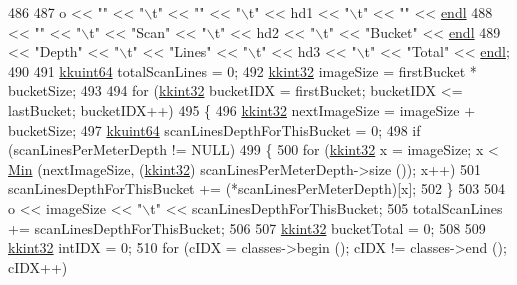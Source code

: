 \begin{DoxyCode}
486 
487   o << \textcolor{stringliteral}{""}      << \textcolor{stringliteral}{"\(\backslash\)t"} << \textcolor{stringliteral}{""}      << \textcolor{stringliteral}{"\(\backslash\)t"} << hd1 << \textcolor{stringliteral}{"\(\backslash\)t"} << \textcolor{stringliteral}{""}       << \hyperlink{namespace_k_k_b_ad1f50f65af6adc8fa9e6f62d007818a8}{endl}
488     << \textcolor{stringliteral}{""}      << \textcolor{stringliteral}{"\(\backslash\)t"} << \textcolor{stringliteral}{"Scan"}  << \textcolor{stringliteral}{"\(\backslash\)t"} << hd2 << \textcolor{stringliteral}{"\(\backslash\)t"} << \textcolor{stringliteral}{"Bucket"} << \hyperlink{namespace_k_k_b_ad1f50f65af6adc8fa9e6f62d007818a8}{endl}
489     << \textcolor{stringliteral}{"Depth"} << \textcolor{stringliteral}{"\(\backslash\)t"} << \textcolor{stringliteral}{"Lines"} << \textcolor{stringliteral}{"\(\backslash\)t"} << hd3 << \textcolor{stringliteral}{"\(\backslash\)t"} << \textcolor{stringliteral}{"Total"}  << \hyperlink{namespace_k_k_b_ad1f50f65af6adc8fa9e6f62d007818a8}{endl};
490 
491   \hyperlink{namespace_k_k_b_a1f2b0568d3b63cc7697dcff73250113e}{kkuint64} totalScanLines = 0;
492   \hyperlink{namespace_k_k_b_a8fa4952cc84fda1de4bec1fbdd8d5b1b}{kkint32}  imageSize = firstBucket * bucketSize;
493 
494   \textcolor{keywordflow}{for}  (\hyperlink{namespace_k_k_b_a8fa4952cc84fda1de4bec1fbdd8d5b1b}{kkint32} bucketIDX = firstBucket;  bucketIDX <= lastBucket;  bucketIDX++)
495   \{
496     \hyperlink{namespace_k_k_b_a8fa4952cc84fda1de4bec1fbdd8d5b1b}{kkint32}  nextImageSize = imageSize + bucketSize;
497     \hyperlink{namespace_k_k_b_a1f2b0568d3b63cc7697dcff73250113e}{kkuint64} scanLinesDepthForThisBucket = 0;
498     \textcolor{keywordflow}{if}  (scanLinesPerMeterDepth != NULL)
499     \{
500       \textcolor{keywordflow}{for}  (\hyperlink{namespace_k_k_b_a8fa4952cc84fda1de4bec1fbdd8d5b1b}{kkint32} x = imageSize;  x < \hyperlink{_raster_8cpp_a6261a282d8ed27242c636ad5fb658585}{Min} (nextImageSize, (\hyperlink{namespace_k_k_b_a8fa4952cc84fda1de4bec1fbdd8d5b1b}{kkint32})
      scanLinesPerMeterDepth->size ());  x++)
501         scanLinesDepthForThisBucket += (*scanLinesPerMeterDepth)[x];
502     \}
503 
504     o <<  imageSize << \textcolor{stringliteral}{"\(\backslash\)t"} << scanLinesDepthForThisBucket;
505     totalScanLines += scanLinesDepthForThisBucket;
506 
507     \hyperlink{namespace_k_k_b_a8fa4952cc84fda1de4bec1fbdd8d5b1b}{kkint32}  bucketTotal = 0;
508 
509     \hyperlink{namespace_k_k_b_a8fa4952cc84fda1de4bec1fbdd8d5b1b}{kkint32}  intIDX = 0;
510     \textcolor{keywordflow}{for}  (cIDX = classes->begin ();  cIDX != classes->end ();  cIDX++)

\end{DoxyCode}
